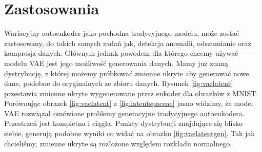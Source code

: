 \documentclass[a4paper,12pt]{book} %
\begin{document}
\section{Zastosowania}
Wariacyjny autoenkoder jako pochodna tradycyjnego modelu, może zostać zastosowany, do takich samych zadań jak, detekcja anomalii, odszumianie oraz kompresja danych. Głównym jednak powodem dla którego chcemy używać modelu VAE jest jego możliwość generowania danych. Mamy już znaną dystrybucję, z której możemy próbkować zmienne ukryte aby generować nowe dane, podobne do oryginalnych ze zbioru danych. Rysunek \ref{fig:vaelatent} przestawia zmienne ukryte wygenerowane przez enkoder dla obrazków z MNIST. Porównując obrazek \ref{fig:vaelatent} z \ref{fig:latentspaceae} jasno widzimy, że model VAE rozwiązał omówione problemy generacyjne tradycyjnego autoenkodera. Przestrzeń jest kompletna i ciągła. Punkty dystrybucji znajdujące się blisko siebie, generują podobne wyniki co widać na obrazku \ref{fig:vaelatentgen}. Tak jak chcieliśmy, zmienne ukryte są rozłożone względem rozkładu normalnego. 
\end{document}
